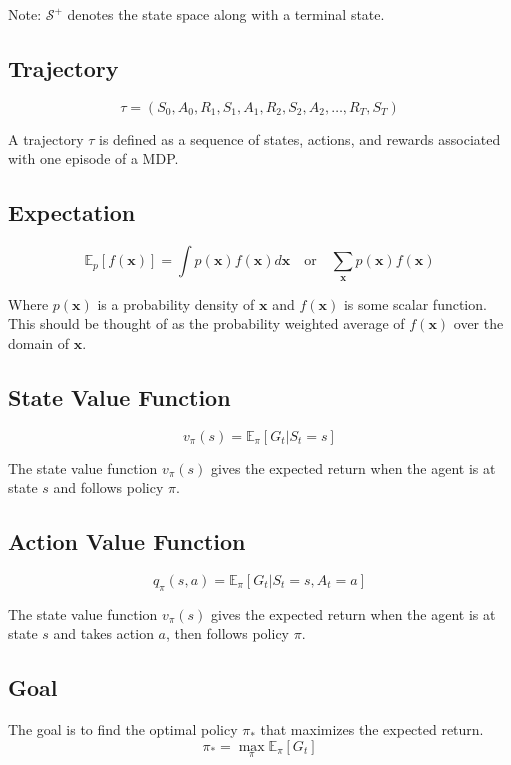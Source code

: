 \documentclass{article}
\begin{document}
Note: $\mathcal{S}^+$ denotes the state space along with a terminal state.

\subsection{Trajectory}
\begin{equation}
  \tau = (S_0, A_0, R_1, S_1, A_1, R_2, S_2, A_2, \dots, R_T, S_T)
\end{equation}

A trajectory $\tau$ is defined as a sequence of states, actions, and rewards associated with one episode of a MDP.

\subsection{Expectation}
\begin{equation}
  \mathbb{E}_p[f(\mathbf{x})] = \int p(\mathbf{x}) f(\mathbf{x}) d\mathbf{x} \quad \mbox{or} \quad \sum_{\mathbf{x}} p(\mathbf{x}) f(\mathbf{x})
\end{equation}

Where $p(\mathbf{x})$ is a probability density of $\mathbf{x}$ and $f(\mathbf{x})$ is some scalar function. This should be thought of 
as the probability weighted average of $f(\mathbf{x})$ over the domain of $\mathbf{x}$.

\subsection{State Value Function}
\begin{equation}
  v_\pi(s) = \mathbb{E}_\pi[G_t|S_t = s]
\end{equation}

The state value function $v_\pi(s)$ gives the expected return when the agent is at state $s$ and follows policy $\pi$.

\subsection{Action Value Function}
\begin{equation}
  q_\pi(s, a) = \mathbb{E}_\pi[G_t|S_t = s, A_t = a]
\end{equation}

The state value function $v_\pi(s)$ gives the expected return when the agent is at state $s$ and takes action $a$, then follows policy $\pi$.

\subsection{Goal}
The goal is to find the optimal policy $\pi_*$ that maximizes the expected return.
\begin{equation}
  \pi_* = \max_{\pi}\mathbb{E}_\pi[G_t]
\end{equation}
\end{document}
